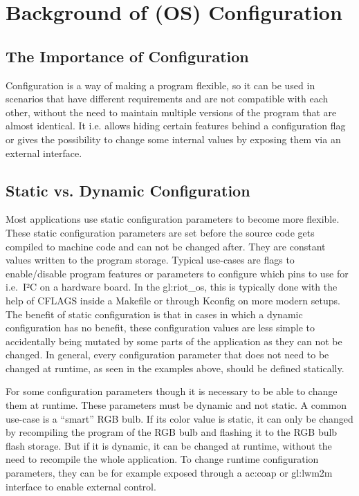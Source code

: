 \chapter{Background of (OS) Configuration}
\label{chapter:background}

\section{The Importance of Configuration}
\label{sec:background:why_configuration_devices}

Configuration is a way of making a program flexible, so it can be used in scenarios that have different requirements and are not compatible with each other, without the need to maintain multiple versions of the program that are almost identical.
It i.e. allows hiding certain features behind a configuration flag or gives the possibility to change some internal values by exposing them via an external interface.

\section{Static vs. Dynamic Configuration}
\label{sec:background:static_vs_dynamic_configuration}

Most applications use static configuration parameters to become more flexible.
These static configuration parameters are set before the source code gets compiled to machine code and can not be changed after. They are constant values written to the program storage.
Typical use-cases are flags to enable/disable program features or parameters to configure which pins to use for i.e.\ I²C on a hardware board.
In the \gls{gl:riot_os}, this is typically done with the help of CFLAGS inside a Makefile \cite{gnu_make} or through Kconfig \cite{linux-kconfig-20} on more modern setups.
The benefit of static configuration is that in cases in which a dynamic configuration has no benefit, these configuration values are less simple to accidentally being mutated by some parts of the application as they can not be changed.
In general, every configuration parameter that does not need to be changed at runtime, as seen in the examples above, should be defined statically.

For some configuration parameters though it is necessary to be able to change them at runtime. These parameters must be dynamic and not static.
A common use-case is a ``smart'' RGB bulb. If its color value is static, it can only be changed by recompiling the program of the RGB bulb and flashing it to the RGB bulb flash storage.
But if it is dynamic, it can be changed at runtime, without the need to recompile the whole application.
To change runtime configuration parameters, they can be for example exposed through a \gls{ac:coap} \cite{RFC-7252} or \gls{gl:lwm2m} interface to enable external control.

